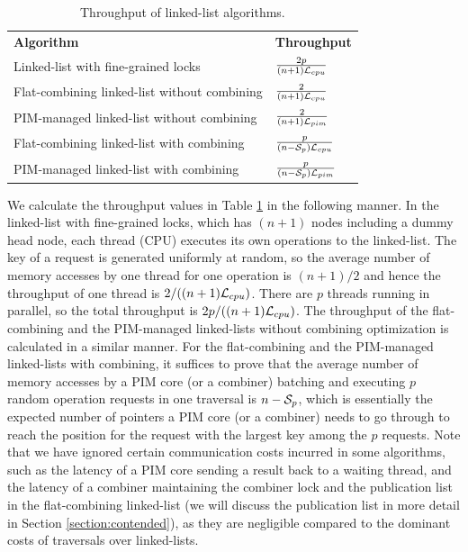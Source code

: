 \renewcommand{\arraystretch}{1.8}
\begin{table}[ht!]
\begin{center}
    \begin{tabular}{| >{\small}l | l |}
    \hline
    \textbf{Algorithm} & \textbf{Throughput}\\ \hhline{|=|=|}
    Linked-list with fine-grained locks & ${2p \over (n+1)\mathcal{L}_{cpu}}$ \\ \hline
    Flat-combining linked-list without combining & ${2 \over (n+1)\mathcal{L}_{cpu}}$ \\ \hline
    PIM-managed linked-list without combining & ${2 \over (n+1)\mathcal{L}_{pim}}$ \\ \hline
    Flat-combining linked-list with combining & ${p \over (n-\mathcal{S}_{p})\mathcal{L}_{cpu}}$ \\ \hline
    PIM-managed linked-list with combining & ${p \over (n-\mathcal{S}_{p})\mathcal{L}_{pim}}$ \\ \hline
    \end{tabular}
\end{center}
\caption{Throughput of linked-list algorithms.}
\label{tab:linkedlist}
\end{table}

We calculate the throughput values in Table \ref{tab:linkedlist} in the following manner. 
In the linked-list with fine-grained locks, which has $(n+1)$ nodes including 
a dummy head node, each thread (CPU) executes its own operations to the linked-list. 
The key of a request is generated uniformly at random, 
so the average number of memory accesses by one thread for one operation is $(n+1)/2$ 
and hence the throughput of one thread is $2/((n+1)\mathcal{L}_{cpu})$. 
There are $p$ threads running in parallel, so the total throughput is $2p/((n+1)\mathcal{L}_{cpu})$. 
The throughput of the flat-combining and the PIM-managed linked-lists without combining optimization 
is calculated in a similar manner. 
For the flat-combining and the PIM-managed linked-lists with combining, it suffices to prove that
the average number of memory accesses by a PIM core (or a combiner) batching and executing 
$p$ random operation requests in one traversal is $n - \mathcal{S}_{p}$, 
which is essentially the expected number of pointers a PIM core (or a combiner) 
needs to go through to reach the position for the request with the largest key among the $p$ requests. 
Note that we have ignored certain communication costs incurred in some algorithms, 
such as the latency of a PIM core sending a result back to a waiting thread, 
and the latency of a combiner maintaining the combiner lock and the publication list in the flat-combining 
linked-list (we will discuss the publication list in more detail in Section \ref{section:contended}), 
as they are negligible compared to the dominant costs of traversals over linked-lists.
 
